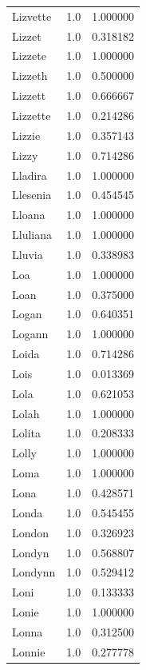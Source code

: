 \documentclass[
  letterpaper,
  DIV=11,
  numbers=noendperiod]{scrreprt}
\begin{document}
\begin{tabular}{lrr}
Lizvette        &   1.0 &   1.000000 \\
Lizzet          &   1.0 &   0.318182 \\
Lizzete         &   1.0 &   1.000000 \\
Lizzeth         &   1.0 &   0.500000 \\
Lizzett         &   1.0 &   0.666667 \\
Lizzette        &   1.0 &   0.214286 \\
Lizzie          &   1.0 &   0.357143 \\
Lizzy           &   1.0 &   0.714286 \\
Lladira         &   1.0 &   1.000000 \\
Llesenia        &   1.0 &   0.454545 \\
Lloana          &   1.0 &   1.000000 \\
Lluliana        &   1.0 &   1.000000 \\
Lluvia          &   1.0 &   0.338983 \\
Loa             &   1.0 &   1.000000 \\
Loan            &   1.0 &   0.375000 \\
Logan           &   1.0 &   0.640351 \\
Logann          &   1.0 &   1.000000 \\
Loida           &   1.0 &   0.714286 \\
Lois            &   1.0 &   0.013369 \\
Lola            &   1.0 &   0.621053 \\
Lolah           &   1.0 &   1.000000 \\
Lolita          &   1.0 &   0.208333 \\
Lolly           &   1.0 &   1.000000 \\
Loma            &   1.0 &   1.000000 \\
Lona            &   1.0 &   0.428571 \\
Londa           &   1.0 &   0.545455 \\
London          &   1.0 &   0.326923 \\
Londyn          &   1.0 &   0.568807 \\
Londynn         &   1.0 &   0.529412 \\
Loni            &   1.0 &   0.133333 \\
Lonie           &   1.0 &   1.000000 \\
Lonna           &   1.0 &   0.312500 \\
Lonnie          &   1.0 &   0.277778 \\

\end{tabular}
\end{document}
